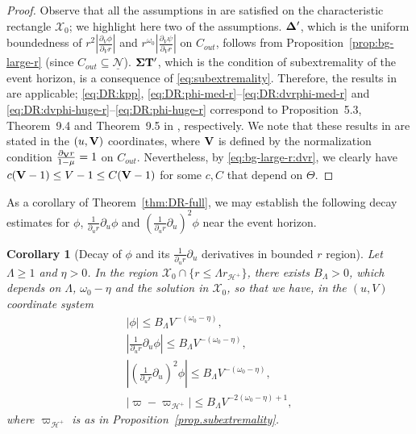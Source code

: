 \documentclass[10pt, reqno]{amsart}
\newtheorem{corollary}[theorem]{Corollary}
\theoremstyle{definition}
\theoremstyle{remark}
\theoremstyle{conjecture}
\numberwithin{equation}{section}
\newcommand{\abs}[1]{\vert#1\vert}
\newcommand{\set}[1]{\{#1\}}
\newcommand{\rd}{\partial}
\newcommand{\0}{\emptyset}
\newcommand{\Dlt}{\Delta}
\newcommand{\Lmb}{\Lambda}
\newcommand{\Sgm}{\Sigma}
\newcommand{\Tht}{\Theta}
\newcommand{\omg}{\omega}
\newcommand{\bfV}{{\bf V}}
\newcommand{\calH}{\mathcal H}
\newcommand{\calN}{\mathcal N}
\newcommand{\calX}{\mathcal X}
\newcommand{\f}{\frac}
\newcommand{\EH}{\calH^{+}}
\newcommand{\Abs}[1]{\left\vert #1 \right\vert}
\begin{document}
\begin{proof}
Observe that all the assumptions in \cite[Section~2]{DRPL} are satisfied on the characteristic rectangle $\calX_{0}$; we highlight here two of the assumptions. ${\bf \Dlt'}$, which is the uniform boundedness of $r^2\left|\f{\rd_V\phi}{\rd_V r}\right|$ and $r^{\omg_0}\left|\f{\rd_V\psi}{\rd_V r}\right|$ on $C_{out}$, follows from Proposition~\ref{prop:bg-large-r} (since $C_{out} \subseteq \underline{\calN}$). ${\bf \Sgm T'}$, which is the condition of subextremality of the event horizon, is a consequence of \eqref{eq:subextremality}. Therefore, the results in \cite{DRPL} are applicable;
\eqref{eq:DR:kpp}, \eqref{eq:DR:phi-med-r}--\eqref{eq:DR:dvrphi-med-r} and \eqref{eq:DR:dvphi-huge-r}--\eqref{eq:DR:phi-huge-r} correspond to Proposition~5.3, Theorem~9.4 and Theorem~9.5 in \cite{DRPL}, respectively. We note that these results in \cite{DRPL} are stated in the $(u, \bfV)$ coordinates, where $\bfV$ is defined by the normalization condition $\frac{\rd_{\bfV} r}{1-\mu} = 1$ on $C_{out}$. Nevertheless, by \eqref{eq:bg-large-r:dvr}, we clearly have $c (\bfV -1) \leq V -1 \leq C (\bfV -1)$ for some $c, C$ that depend on $\Tht$. \qedhere
\end{proof}

As a corollary of Theorem~\ref{thm:DR-full}, we may establish the following decay estimates for $\phi$, $\frac{1}{\rd_{u} r}\rd_{u} \phi$ and $(\frac{1}{\rd_{u} r} \rd_{u} )^{2} \phi$ near the event horizon.
\begin{corollary}[Decay of $\phi$ and its $\frac{1}{\rd_{u} r}\rd_u$ derivatives in bounded $r$ region] \label{cor:DR-small-r}
Let $\Lmb \geq 1$ and $\eta > 0$. In the region $\calX_{0} \cap \set{r \leq \Lmb r_{\EH}}$, there exists $B_{\Lmb} >  0 $, which depends on $\Lmb$, $\omg_{0}-\eta$ and the solution in $\calX_{0}$, so that we have, in the $(u,V)$ coordinate system
\begin{align} 
	\Abs{\phi} \leq B_{\Lmb} V^{-(\omg_{0}-\eta)}, \label{eq:DR:phi-small-r} \\
	\Abs{\frac{1}{\rd_{u} r} \rd_{u} \phi} \leq B_{\Lmb} V^{-(\omg_{0}-\eta)}, \label{eq:DR:duphi-small-r} \\
	\Abs{\left(\frac{1}{\rd_{u} r} \rd_{u}\right)^{2} \phi} \leq B_{\Lmb} V^{-(\omg_{0}-\eta)},\label{eq:DR:duduphi-small-r} \\
	\abs{\varpi - \varpi_{\EH}} \leq B_{\Lmb} V^{- 2(\omg_{0} - \eta) + 1}, \label{eq:DR:varpi-small-r}
\end{align}
where $\varpi_{\EH}$ is as in Proposition~\ref{prop.subextremality}.
\end{corollary}
\end{document}
